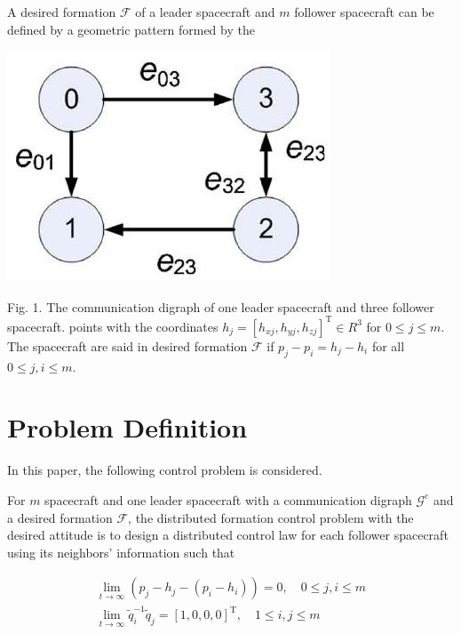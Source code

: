 \documentclass[10pt]{article}
\begin{document}
A desired formation $\mathcal{F}$ of a leader spacecraft and $m$ follower spacecraft can be defined by a geometric pattern formed by the

\begin{center}
\includegraphics[max width=\textwidth]{2023_10_07_a50fd94fd281fe9896c1g-03}
\end{center}

Fig. 1. The communication digraph of one leader spacecraft and three follower spacecraft. points with the coordinates $h_{j}=\left[h_{x j}, h_{y j}, h_{z j}\right]^{\mathrm{T}} \in R^{3}$ for $0 \leq j \leq m$. The spacecraft are said in desired formation $\mathcal{F}$ if $p_{j}-p_{i}=h_{j}-h_{i}$ for all $0 \leq j, i \leq m$.

\section{Problem Definition}
In this paper, the following control problem is considered.

For $m$ spacecraft and one leader spacecraft with a communication digraph $\mathcal{G}^{e}$ and a desired formation $\mathcal{F}$, the distributed formation control problem with the desired attitude is to design a distributed control law for each follower spacecraft using its neighbors' information such that

$$
\begin{gathered}
\lim _{t \rightarrow \infty}\left(p_{j}-h_{j}-\left(p_{i}-h_{i}\right)\right)=0, \quad 0 \leq j, i \leq m \\
\lim _{t \rightarrow \infty} \tilde{q}_{i}^{-1} \tilde{q}_{j}=[1,0,0,0]^{\mathrm{T}}, \quad 1 \leq i, j \leq m
\end{gathered}
$$
\end{document}
